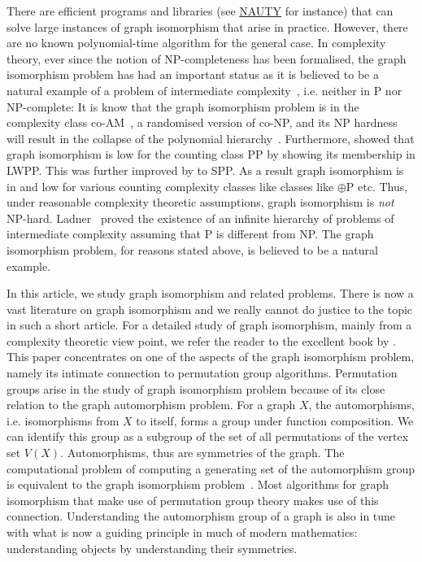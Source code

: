 \documentclass{article}
\begin{document}
There are efficient programs and libraries (see
\href{http://pallini.di.uniroma1.it/}{NAUTY} for instance) that can
solve large instances of graph isomorphism that arise in
practice. However, there are no known polynomial-time algorithm for
the general case. In complexity theory, ever since the notion of
NP-completeness has been formalised, the graph isomorphism problem has
had an important status as it is believed to be a natural example of a
problem of intermediate complexity~\cite[Chapter 7]{garey-johnson},
i.e. neither in P nor NP-complete: It is know that the graph
isomorphism problem is in the complexity class
co-AM~\cite{boppana87does}, a randomised version of co-NP, and its NP
hardness will result in the collapse of the polynomial
hierarchy~\cite{boppana87does,schoning87graph}. Furthermore,
\citet{kobler92graph} showed that graph isomorphism is low for the
counting class PP by showing its membership in LWPP. This was further
improved by \citet{arvind2002graph} to SPP. As a result graph
isomorphism is in and low for various counting complexity classes like
classes like $\oplus \mathrm{P}$ etc. Thus, under reasonable
complexity theoretic assumptions, graph isomorphism is \emph{not}
NP-hard.  Ladner~\cite{ladner75ptimereduce} proved the existence of an
infinite hierarchy of problems of intermediate complexity assuming
that P is different from NP. The graph isomorphism problem, for
reasons stated above, is believed to be a natural example.

In this article, we study graph isomorphism and related
problems. There is now a vast literature on graph isomorphism and we
really cannot do justice to the topic in such a short article. For a
detailed study of graph isomorphism, mainly from a complexity
theoretic view point, we refer the reader to the excellent book by
\citet{gi-book}. This paper concentrates on one of the aspects of the
graph isomorphism problem, namely its intimate connection to
permutation group algorithms. Permutation groups arise in the study of
graph isomorphism problem because of its close relation to the graph
automorphism problem. For a graph $X$, the automorphisms,
i.e. isomorphisms from $X$ to itself, forms a group under function
composition. We can identify this group as a subgroup of the set of
all permutations of the vertex set $V(X)$. Automorphisms, thus are
symmetries of the graph. The computational problem of computing a
generating set of the automorphism group is equivalent to the graph
isomorphism problem~\cite{mathon79note}. Most algorithms for graph
isomorphism that make use of permutation group theory makes use of
this connection. Understanding the automorphism group of a graph is
also in tune with what is now a guiding principle in much of modern
mathematics: understanding objects by understanding their symmetries.
\end{document}
